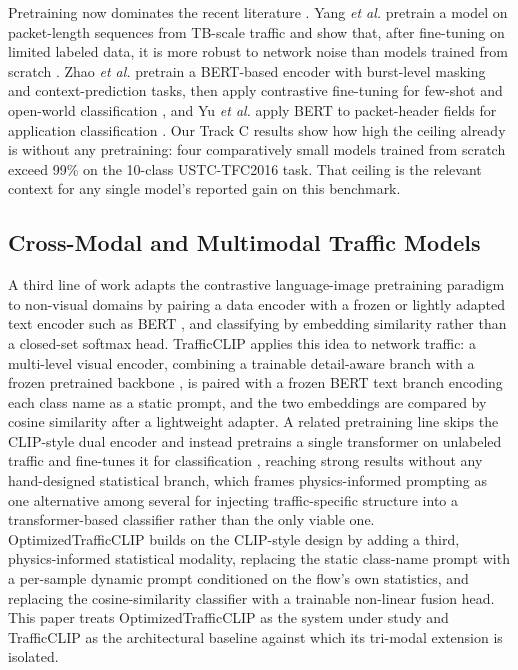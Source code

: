 \documentclass[journal]{IEEEtran}
\begin{document}
Pretraining now dominates the recent literature \cite{dong2025review}. Yang \emph{et al.} pretrain a model on packet-length sequences from TB-scale traffic and show that, after fine-tuning on limited labeled data, it is more robust to network noise than models trained from scratch \cite{yang2025robust}. Zhao \emph{et al.} pretrain a BERT-based encoder with burst-level masking and context-prediction tasks, then apply contrastive fine-tuning for few-shot and open-world classification \cite{zhao2026fewshot}, and Yu \emph{et al.} apply BERT to packet-header fields for application classification \cite{yu2024bert}. Our Track C results show how high the ceiling already is without any pretraining: four comparatively small models trained from scratch exceed 99\% on the 10-class USTC-TFC2016 task. That ceiling is the relevant context for any single model's reported gain on this benchmark.

\subsection{Cross-Modal and Multimodal Traffic Models}

A third line of work adapts the contrastive language-image pretraining paradigm \cite{clip} to non-visual domains by pairing a data encoder with a frozen or lightly adapted text encoder such as BERT \cite{bert}, and classifying by embedding similarity rather than a closed-set softmax head. TrafficCLIP \cite{trafficclip} applies this idea to network traffic: a multi-level visual encoder, combining a trainable detail-aware branch with a frozen pretrained backbone \cite{resnet}, is paired with a frozen BERT text branch encoding each class name as a static prompt, and the two embeddings are compared by cosine similarity after a lightweight adapter. A related pretraining line skips the CLIP-style dual encoder and instead pretrains a single transformer on unlabeled traffic and fine-tunes it for classification \cite{zhao2026fewshot,yang2025robust}, reaching strong results without any hand-designed statistical branch, which frames physics-informed prompting as one alternative among several for injecting traffic-specific structure into a transformer-based classifier rather than the only viable one. OptimizedTrafficCLIP builds on the CLIP-style design by adding a third, physics-informed statistical modality, replacing the static class-name prompt with a per-sample dynamic prompt conditioned on the flow's own statistics, and replacing the cosine-similarity classifier with a trainable non-linear fusion head. This paper treats OptimizedTrafficCLIP as the system under study and TrafficCLIP as the architectural baseline against which its tri-modal extension is isolated.
\end{document}
